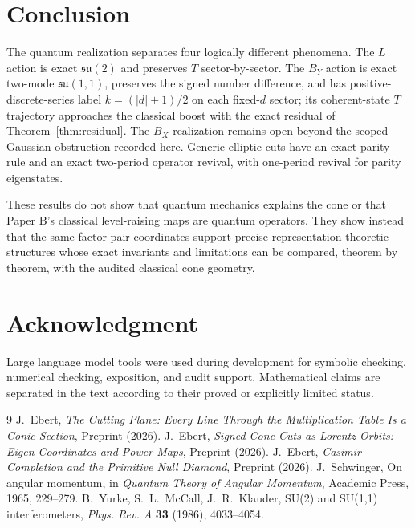 \documentclass[11pt]{amsart}
\theoremstyle{remark}
\begin{document}
\section{Conclusion}
The quantum realization separates four logically different phenomena.  The $L$ action is exact $\mathfrak{su}(2)$ and preserves $T$ sector-by-sector.  The $B_Y$ action is exact two-mode $\mathfrak{su}(1,1)$, preserves the signed number difference, and has positive-discrete-series label $k=(|d|+1)/2$ on each fixed-$d$ sector; its coherent-state $T$ trajectory approaches the classical boost with the exact residual of Theorem~\ref{thm:residual}.  The $B_X$ realization remains open beyond the scoped Gaussian obstruction recorded here.  Generic elliptic cuts have an exact parity rule and an exact two-period operator revival, with one-period revival for parity eigenstates.

These results do not show that quantum mechanics explains the cone or that Paper B's classical level-raising maps are quantum operators.  They show instead that the same factor-pair coordinates support precise representation-theoretic structures whose exact invariants and limitations can be compared, theorem by theorem, with the audited classical cone geometry.

\section*{Acknowledgment}
Large language model tools were used during development for symbolic checking, numerical checking, exposition, and audit support.  Mathematical claims are separated in the text according to their proved or explicitly limited status.

\begin{thebibliography}{9}
 J.~Ebert, \emph{The Cutting Plane: Every Line Through the Multiplication Table Is a Conic Section}, Preprint (2026).
 J.~Ebert, \emph{Signed Cone Cuts as Lorentz Orbits: Eigen-Coordinates and Power Maps}, Preprint (2026).
 J.~Ebert, \emph{Casimir Completion and the Primitive Null Diamond}, Preprint (2026).
 J.~Schwinger, On angular momentum, in \emph{Quantum Theory of Angular Momentum}, Academic Press, 1965, 229--279.
 B.~Yurke, S.~L.~McCall, J.~R.~Klauder, SU(2) and SU(1,1) interferometers, \emph{Phys. Rev. A} \textbf{33} (1986), 4033--4054.
\end{thebibliography}
\end{document}
